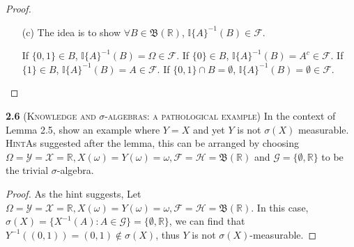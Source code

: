 \begin{proof}
\begin{enumerate}
    Also, since $X$ is $\cF/\cG$-measurable, we have $\mathcal{G} \subseteq \mathcal{H}$.
    Thus $\mathcal{H}$ is $\sigma$-algebra that contains $\mathcal{G}$.
    By applying the result of (a), we have $\sigma(\mathcal{G}) \subseteq \mathcal{H}$, which completes the proof.

    \item[(c)] The idea is to show $\forall B \in \mathfrak{B}(\mathbb{R})$, $\mathbb{I}\{A\}^{-1}(B) \in \mathcal{F}$.

    If $\{0,1\} \in B$, $\mathbb{I}\{A\}^{-1}(B)=\Omega \in \mathcal{F}$. If $\{0\} \in B$, $\mathbb{I}\{A\}^{-1}(B)=A^c \in \mathcal{F}$. If $\{1\} \in B$, $\mathbb{I}\{A\}^{-1}(B)=A \in \mathcal{F}$. If $\{0,1\} \cap B = \emptyset$, $\mathbb{I}\{A\}^{-1}(B)=\emptyset \in \mathcal{F}$.
\end{enumerate}
\end{proof}

\noindent\textbf{2.6}
(\textsc{Knowledge and $\sigma$-algebras: a pathological example}) In the context
of Lemma 2.5, show an example where $Y = X$ and yet $Y$ is not $\sigma(X)$ measurable. \\

\noindent\textsc{Hint}\quad As suggested after the lemma, this can be arranged by choosing $\Omega= \mathcal{Y} = \mathcal{X} = \mathbb{R}, X(\omega) = Y(\omega) = \omega, \mathcal{F} = \mathcal{H} = \mathfrak{B}(\mathbb{R})$
and $\mathcal{G} = \{\emptyset,\mathbb{R}\}$ to be the trivial $\sigma$-algebra.

\begin{proof}
As the hint suggests, Let $\Omega= \mathcal{Y} = \mathcal{X} = \mathbb{R}, X(\omega) = Y(\omega) = \omega, \mathcal{F} = \mathcal{H} = \mathfrak{B}(\mathbb{R})$. 
In this case, $\sigma(X) = \{{X}^{-1}(A): A \in \mathcal{G}\} = \{\emptyset, \mathbb{R}\}$, we can find that $Y^{-1}((0, 1))=(0, 1) \notin \sigma(X)$, thus $Y$ is not $\sigma(X)$-measurable.
\end{proof}


